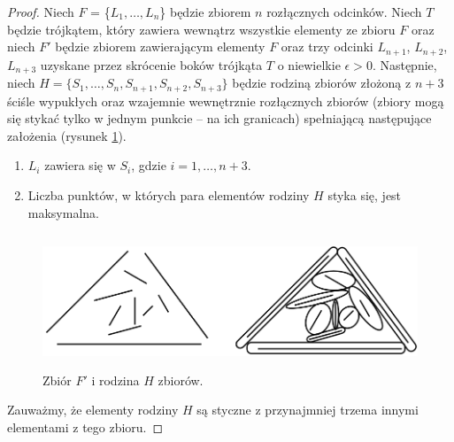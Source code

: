 \documentclass{xmgr}
\theoremstyle{definition}
\begin{document}
\begin{proof}
\indent Niech $F$ = \{$L_1, \ldots, L_n$\} będzie zbiorem $n$ rozłącznych odcinków. Niech $T$ będzie trójkątem, który zawiera wewnątrz wszystkie elementy ze zbioru $F$ oraz niech $F'$ będzie zbiorem zawierającym elementy $F$ oraz trzy odcinki $L_{n+1}$, $L_{n+2}$, $L_{n+3}$ uzyskane przez skrócenie boków trójkąta $T$ o niewielkie $\epsilon > 0$.
Następnie, niech $H = \{S_1,\ldots,S_n,S_{n+1},S_{n+2},S_{n+3}\}$ będzie rodziną zbiorów złożoną z $n + 3$ ściśle wypukłych oraz wzajemnie wewnętrznie rozłącznych zbiorów (zbiory mogą się stykać tylko w jednym punkcie -- na ich granicach) spełniającą następujące założenia (rysunek \ref{fig:zbior f rodzina h}).
\begin{enumerate}
  \item $L_i$ zawiera się w $S_i$, gdzie $i = 1,\ldots,n+3$.
  \item Liczba punktów, w których para elementów rodziny $H$ styka się, jest maksymalna.
\end{enumerate}
\begin{figure}[ht!]
 \centering
  \includegraphics[height=4cm, width=13.5cm]{rysunki/podswietlenie.png}
  \caption{Zbiór $F'$ i rodzina $H$ zbiorów.}
  \label{fig:zbior f rodzina h}
\end{figure} 
Zauważmy, że elementy rodziny $H$ są styczne z przynajmniej trzema innymi elementami z tego zbioru. 


\end{proof}
\end{document}
